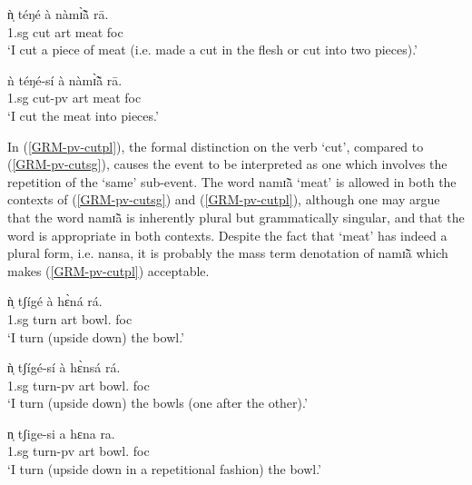 \begin{exe}
\begin{exe}
\begin{exe}
{\begin{exe}
\begin{exe}
\begin{exe}
\begin{exe}
\begin{exe}
\begin{exe}
\begin{exe}
\begin{exe}
\begin{exe}
\begin{exe}
\begin{exe}
\begin{exe}
\begin{exe}
\begin{exe}
\begin{exe}
\begin{exe}
\begin{exe}
\begin{exe}
\begin{exe}
\begin{exe}
\begin{exe}
\ea\label{ex:GRM-pv-cut}
  
 \ea\label{GRM-pv-cutsg}
\gll   ǹ̩  téŋé  à nàmɪ̃̀ã̀  rā.\\
    {\sc 1.sg} {cut}  {\sc art} {meat} {\sc foc}\\
\glt `I cut a piece of meat (i.e.  made a cut in the flesh or cut into two
pieces).'

\ex\label{GRM-pv-cutpl}
\gll ǹ téŋé-sí  à nàmɪ̃̀ã̀  rā.\\
    {\sc 1.sg} {cut-{\sc pv}} {\sc art} {meat} {\sc foc}\\
\glt `I cut the meat into pieces.'

 
\z 
 \z

In  (\ref{GRM-pv-cutpl}),  the formal distinction on the verb `cut',  compared
to (\ref{GRM-pv-cutsg}),  causes  the event to be interpreted as one which
involves the repetition of the `same'  sub-event.  The word {\sls namɪ̃ã} 
`meat'
is allowed in both the contexts of (\ref{GRM-pv-cutsg}) and
(\ref{GRM-pv-cutpl}), although one may argue that the word {\sls namɪ̃ã} is
inherently
plural but grammatically singular,  and that the word is appropriate in both
contexts. Despite the fact that  `meat' has indeed a plural form, i.e. {\sls 
nansa}, it is probably the mass term denotation of {\sls namɪ̃ã} which 
makes (\ref{GRM-pv-cutpl}) acceptable. 


\ea\label{GRM-pv-turn}
  
 \ea\label{GRM-pv-turnsg}
\gll   ǹ̩  tʃígé  à  hɛ̀ná  rá.\\
  {\sc 1.sg} {turn} {\sc art} {bowl.\sg} {\sc foc}\\
\glt `I turn (upside down) the bowl.'

 \ex\label{GRM-pv-turnpl1}
\gll   ǹ̩  tʃígé-sí  à  hɛ̀nsá  rá.\\
   {\sc 1.sg}   {turn-{\sc pv}} {\sc art} {bowl.\pl} {\sc foc}\\
\glt `I turn (upside down) the bowls (one after the other).'


 \ex\label{GRM-pv-turnpl2}
  n̩  tʃige-si   a  hɛna  ra.\\
    {}  {\sc 1.sg} {turn-{\sc pv}} {\sc art}  {bowl.\sg}  {\sc foc}\\
\glt `I turn (upside down in a repetitional fashion) the bowl.'

\z 
 \z


\end{exe}
\end{exe}
\end{exe}
\end{exe}
\end{exe}
\end{exe}
\end{exe}
\end{exe}
\end{exe}
\end{exe}
\end{exe}
\end{exe}
\end{exe}
\end{exe}
\end{exe}
\end{exe}
\end{exe}
\end{exe}
\end{exe}
\end{exe}
\end{exe}}
\end{exe}
\end{exe}
\end{exe}
